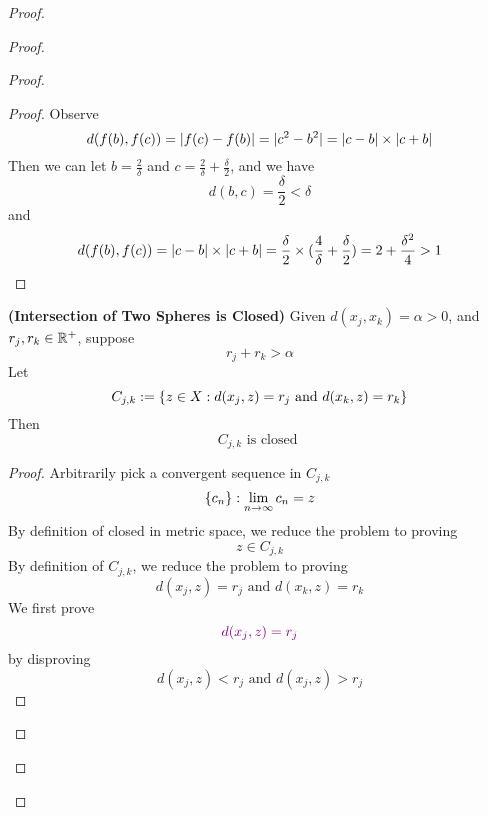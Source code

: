 \documentclass{report}
\begin{document}
\begin{proof}
\begin{proof}
\begin{proof}
\begin{proof}
Observe
\begin{equation*}
d(f(b),f(c))=|f(c)-f(b)|=|c^2-b^2|=|c-b|\times |c+b|
\end{equation*}
Then  we can let $b=\frac{2}{\delta}$ and $c=\frac{2}{\delta}+\frac{\delta}{2}$, and we have
\begin{equation*}
d(b,c)=\frac{\delta}{2}<\delta
\end{equation*}
and
\begin{equation*}
d(f(b),f(c))=|c-b|\times |c+b|=\frac{\delta}{2}\times (\frac{4}{\delta}+\frac{\delta}{2})=2+\frac{\delta^2}{4}>1
\end{equation*}
\end{proof}
\begin{lemma} 
\label{5.2.4}
\textbf{(Intersection of Two Spheres is Closed)} Given $d(x_j,x_k)=\alpha >0$, and $r_j,r_k\in\mathbb{R}^+$, suppose 
\begin{equation*}
r_j+r_k>\alpha 
\end{equation*}
Let
\begin{equation*}
C_{j,k}:=\{ z \in X: d(x_j,z)=r_j\text{ and }d(x_k,z)=r_k \}
\end{equation*}
Then
\begin{equation*}
C_{j,k}\text{ is closed }
\end{equation*}
\end{lemma}
\begin{proof}
Arbitrarily pick a convergent sequence in $C_{j,k}$
\begin{equation*}
\{ c_n \}:\lim_{n\to\infty}c_n=z
\end{equation*}
By definition of closed in metric space, we reduce the problem to proving
\begin{equation*}
z\in C_{j,k}
\end{equation*}
By definition of $C_{j,k}$, we reduce the problem to proving 
\begin{equation*}
d(x_j,z)=r_j\text{ and }d(x_k,z)=r_k
\end{equation*}
We first prove 
\begin{equation*}
  \textcolor{violet}{d(x_j,z)=r_j}
\end{equation*}
by disproving
\begin{equation*}
d(x_j,z)<r_j \text{ and }d(x_j,z)>r_j

\end{equation*}
\end{proof}
\end{proof}
\end{proof}
\end{proof}
\end{document}
